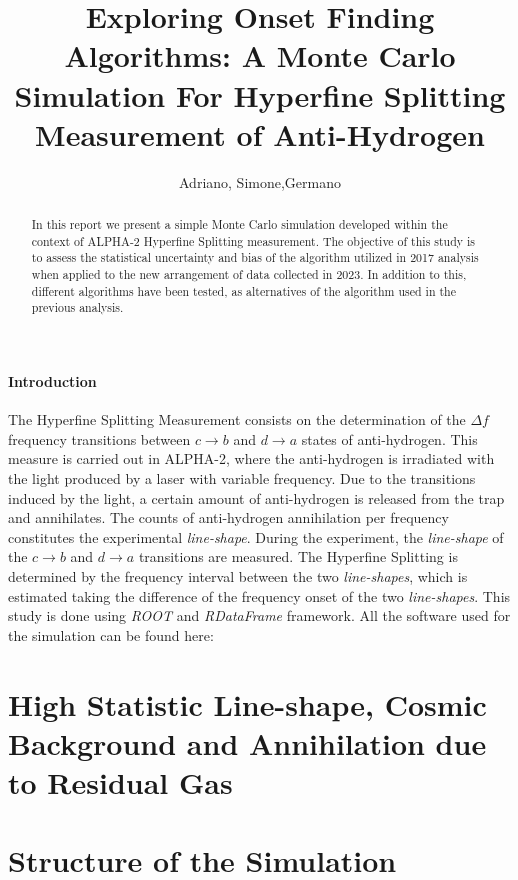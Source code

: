 \documentclass[11pt,a4paper,oneside]{article}
\title{%
 \vspace{-2.0cm}
 Exploring Onset Finding Algorithms: A Monte Carlo \\ Simulation For  Hyperfine Splitting Measurement of Anti-Hydrogen
}
\date{\vspace{-5ex}}
\author{Adriano, Simone,Germano }
\begin{document}

\maketitle
\begin{abstract}
\centering
In this report we present a simple Monte Carlo simulation developed within the context of ALPHA-2 Hyperfine Splitting measurement. The objective of this study is to assess the statistical uncertainty and bias of the algorithm utilized in 2017 analysis when applied to the new arrangement of data collected in 2023. In addition to this, different algorithms have been tested, as alternatives of the algorithm used in the previous analysis.
\end{abstract}

\paragraph{Introduction}

The Hyperfine Splitting Measurement consists on the determination of the $\Delta f$ frequency transitions between $c \rightarrow b$ and $ d \rightarrow a$ states of anti-hydrogen. This measure is carried out in ALPHA-2, where the anti-hydrogen is irradiated with the light produced by a laser with variable frequency. Due to the transitions induced by the light, a certain amount of anti-hydrogen is released from the trap and annihilates. The counts of anti-hydrogen annihilation per frequency constitutes the experimental \textit{line-shape}. During the experiment, the \textit{line-shape} of the $c \rightarrow b$ and $ d \rightarrow a$ transitions are measured. The Hyperfine Splitting is determined by the frequency interval between the two \textit{line-shapes}, which is estimated taking the difference of the frequency onset of the two \textit{line-shapes}. This study is done using \textit{ROOT} and \textit{RDataFrame} framework. All the software used for the simulation can be found here: {}

\section{High Statistic Line-shape, Cosmic Background and Annihilation due to Residual Gas}

\section{Structure of the Simulation}
\end{document}
